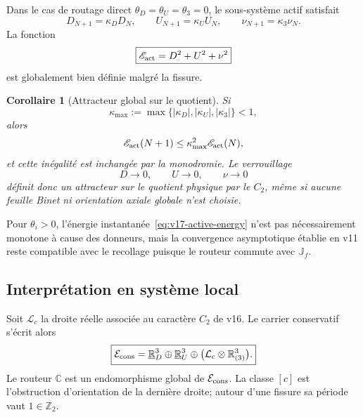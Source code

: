 \documentclass[11pt,a4paper]{article}
\newtheorem{corollary}[theorem]{Corollaire}
\newcommand{\R}{\mathbb R}
\newcommand{\Z}{\mathbb Z}
\begin{document}
Dans le cas de routage direct $\theta_D=\theta_U=\theta_3=0$, le sous-système actif satisfait
\[
 D_{N+1}=\kappa_DD_N,
 \qquad
 U_{N+1}=\kappa_UU_N,
 \qquad
 \nu_{N+1}=\kappa_3\nu_N.
\]
La fonction
\begin{equation}\label{eq:v17-active-energy}
 \boxed{
 \mathscr E_{\rm act}
 =D^2+U^2+\nu^2}
\end{equation}
est globalement bien définie malgré la fissure.

\begin{corollary}[Attracteur global sur le quotient]\label{cor:v17-global-lock}
Si
\[
 \kappa_{\max}:=\max\{|\kappa_D|,|\kappa_U|,|\kappa_3|\}<1,
\]
alors
\[
 \mathscr E_{\rm act}(N+1)
 \le\kappa_{\max}^2\mathscr E_{\rm act}(N),
\]
et cette inégalité est inchangée par la monodromie. Le verrouillage
\[
 D\to0,
 \qquad U\to0,
 \qquad \nu\to0
\]
définit donc un attracteur sur le quotient physique par le $C_2$, même si aucune feuille Binet ni orientation axiale globale n'est choisie.
\end{corollary}

Pour $\theta_i>0$, l'énergie instantanée~\eqref{eq:v17-active-energy} n'est pas nécessairement monotone à cause des donneurs, mais la convergence asymptotique établie en v11 reste compatible avec le recollage puisque le routeur commute avec $\mathbb J_f$.

\subsection{Interprétation en système local}

Soit $\mathcal L_c$ la droite réelle associée au caractère $C_2$ de v16. Le carrier conservatif s'écrit alors
\begin{equation}\label{eq:v17-bundle}
 \boxed{
 \mathcal E_{\rm cons}
 =\underline{\R}^{3}_{D}
 \oplus
 \underline{\R}^{3}_{U}
 \oplus
 \bigl(\mathcal L_c\otimes\R^3_{(3)}\bigr).}
\end{equation}
Le routeur $\mathbb C$ est un endomorphisme global de $\mathcal E_{\rm cons}$. La classe $[c]$ est l'obstruction d'orientation de la dernière droite; autour d'une fissure sa période vaut $1\in\Z_2$.
\end{document}
